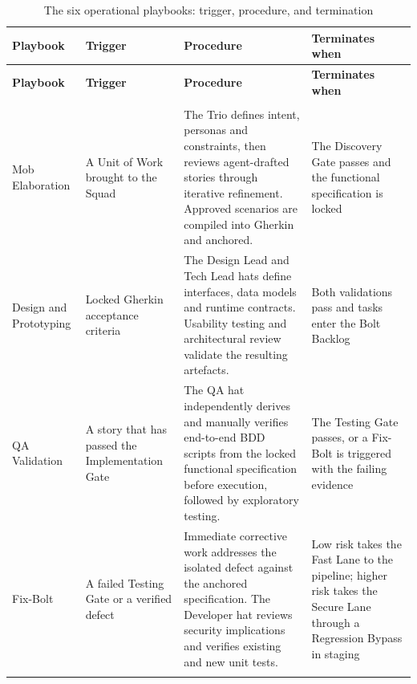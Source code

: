 {\footnotesize
\begin{longtable}{>{\raggedright\arraybackslash}p{2.1cm}
                  >{\raggedright\arraybackslash}p{2.8cm}
                  >{\raggedright\arraybackslash}p{6.3cm}
                  >{\raggedright\arraybackslash}p{3.0cm}}
\caption{The six operational playbooks: trigger, procedure, and termination}
\label{tab:playbooks} \\
\toprule
\textbf{Playbook} & \textbf{Trigger} & \textbf{Procedure} & \textbf{Terminates when} \\
\midrule
\endfirsthead

\toprule
\textbf{Playbook} & \textbf{Trigger} & \textbf{Procedure} & \textbf{Terminates when} \\
\midrule
\endhead

\midrule
\multicolumn{4}{r}{\textit{Continued on next page}}\\
\bottomrule
\endfoot

\bottomrule
\endlastfoot

Mob Elaboration
& A Unit of Work brought to the Squad
& The Trio defines intent, personas and constraints, then reviews agent-drafted stories through iterative refinement. Approved scenarios are compiled into Gherkin and anchored.
& The Discovery Gate passes and the functional specification is locked
\\ \addlinespace

Design and Prototyping
& Locked Gherkin acceptance criteria
& The Design Lead and Tech Lead hats define interfaces, data models and runtime contracts. Usability testing and architectural review validate the resulting artefacts.
& Both validations pass and tasks enter the Bolt Backlog
\\ \addlinespace

\ac{QA} Validation
& A story that has passed the Implementation Gate
& The \ac{QA} hat independently derives and manually verifies end-to-end \ac{BDD} scripts from the locked functional specification before execution, followed by exploratory testing.
& The Testing Gate passes, or a Fix-Bolt is triggered with the failing evidence
\\ \addlinespace

Fix-Bolt
& A failed Testing Gate or a verified defect
& Immediate corrective work addresses the isolated defect against the anchored specification. The Developer hat reviews security implications and verifies existing and new unit tests.
& Low risk takes the Fast Lane to the pipeline; higher risk takes the Secure Lane through a Regression Bypass in staging
\\ \addlinespace


\end{longtable}}
